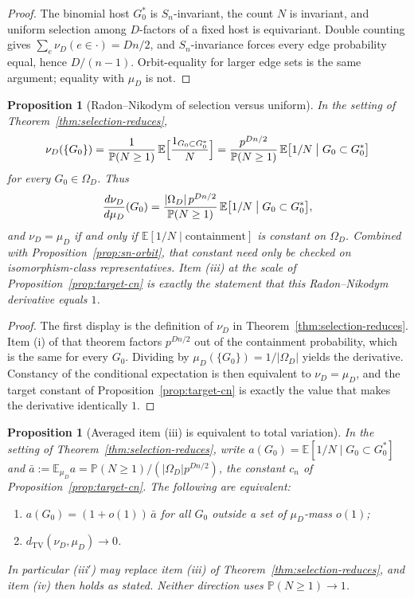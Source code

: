 \documentclass[11pt]{article}
\newtheorem{proposition}[theorem]{Proposition}
\newcommand{\EE}{\mathbb{E}}
\newcommand{\PP}{\mathbb{P}}
\newcommand{\dTV}{d_{\mathrm{TV}}}
\begin{document}
\begin{proof}
The binomial host \(G^*_0\) is \(S_n\)-invariant, the count \(N\) is invariant,
and uniform selection among \(D\)-factors of a fixed host is equivariant.
Double counting gives
\(\sum_e\nu_D(e\in\cdot)=Dn/2\), and \(S_n\)-invariance forces every edge
probability equal, hence \(D/(n-1)\).
Orbit-equality for larger edge sets is the same argument; equality with
\(\mu_D\) is not.
\end{proof}

\begin{proposition}[Radon--Nikodym of selection versus uniform]
\label{prop:nu-rn}
In the setting of Theorem~\ref{thm:selection-reduces},
\[
\nu_D(\{G_0\})
=
\frac{1}{\PP(N\ge 1)}\,
\EE\Bigl[\frac{1_{G_0\subset G^*_0}}{N}\Bigr]
=
\frac{p^{Dn/2}}{\PP(N\ge 1)}\,
\EE\bigl[1/N\bigm|G_0\subset G^*_0\bigr]
\]
for every \(G_0\in\Omega_D\).
Thus
\[
\frac{d\nu_D}{d\mu_D}(G_0)
=
\frac{\lvert\Omega_D\rvert\,p^{Dn/2}}{\PP(N\ge 1)}\,
\EE\bigl[1/N\bigm|G_0\subset G^*_0\bigr],
\]
and \(\nu_D=\mu_D\) if and only if \(\EE[1/N\mid\text{containment}]\) is constant
on \(\Omega_D\).
Combined with Proposition~\ref{prop:sn-orbit}, that constant need only be
checked on isomorphism-class representatives.
Item (iii) at the scale of Proposition~\ref{prop:target-cn} is exactly the
statement that this Radon--Nikodym derivative equals \(1\).
\end{proposition}

\begin{proof}
The first display is the definition of \(\nu_D\) in
Theorem~\ref{thm:selection-reduces}.
Item (i) of that theorem factors \(p^{Dn/2}\) out of the containment
probability, which is the same for every \(G_0\).
Dividing by \(\mu_D(\{G_0\})=1/\lvert\Omega_D\rvert\) yields the derivative.
Constancy of the conditional expectation is then equivalent to
\(\nu_D=\mu_D\), and the target constant of Proposition~\ref{prop:target-cn}
is exactly the value that makes the derivative identically \(1\).
\end{proof}

\begin{proposition}[Averaged item (iii) is equivalent to total variation]
\label{prop:iii-averaged}
In the setting of Theorem~\ref{thm:selection-reduces}, write
\(a(G_0)=\EE[1/N\mid G_0\subset G^*_0]\) and
\(\bar a:=\EE_{\mu_D}a=\PP(N\ge1)/(\lvert\Omega_D\rvert p^{Dn/2})\), the constant
\(c_n\) of Proposition~\ref{prop:target-cn}. The following are equivalent:
\begin{enumerate}
\item[(iii\('\))] \(a(G_0)=(1+o(1))\,\bar a\) for all \(G_0\) outside a set of
\(\mu_D\)-mass \(o(1)\);
\item[(TV)] \(\dTV(\nu_D,\mu_D)\to0\).
\end{enumerate}
In particular (iii\('\)) may replace item (iii) of
Theorem~\ref{thm:selection-reduces}, and item (iv) then holds as stated. Neither
direction uses \(\PP(N\ge1)\to1\).
\end{proposition}
\end{document}
